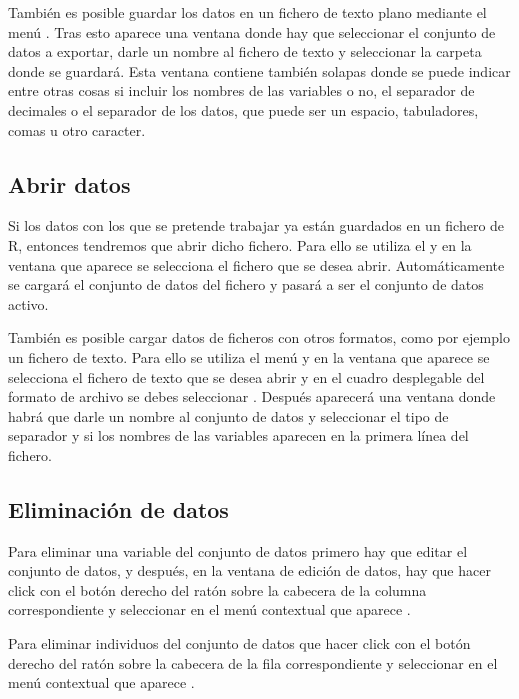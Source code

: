 También es posible guardar los datos en un fichero de texto plano mediante el menú .
Tras esto aparece una ventana donde hay que seleccionar el conjunto de datos a exportar, darle un nombre al fichero de
texto y seleccionar la carpeta donde se guardará.
Esta ventana contiene también solapas donde se puede indicar entre otras cosas si incluir los nombres de las variables o
no, el separador de decimales o el separador de los datos, que puede ser un espacio, tabuladores, comas u otro caracter.


\subsection{Abrir datos}
Si los datos con los que se pretende trabajar ya están guardados en un fichero de R, entonces tendremos que abrir dicho
fichero. Para ello se utiliza el  y en la ventana que aparece
se selecciona el fichero que se desea abrir.
Automáticamente se cargará el conjunto de datos del fichero y pasará a ser el conjunto de datos activo.

También es posible cargar datos de ficheros con otros formatos, como por ejemplo un fichero de texto.
Para ello se utiliza el menú  y en la ventana que aparece se
selecciona el fichero de texto que se desea abrir y en el cuadro desplegable del formato de archivo se debes seleccionar
.
Después aparecerá una ventana donde habrá que darle un nombre al conjunto de datos y seleccionar el tipo de separador y
si los nombres de las variables aparecen en la primera línea del fichero.


\subsection{Eliminación de datos}
Para eliminar una variable del conjunto de datos primero hay que editar el conjunto de datos, y después, en la ventana
de edición de datos, hay que hacer click con el botón derecho del ratón sobre la cabecera de la columna correspondiente
y seleccionar en el menú contextual que aparece .

Para eliminar individuos del conjunto de datos que hacer click con el botón derecho del ratón sobre la cabecera de la
fila correspondiente y seleccionar en el menú contextual que aparece .

